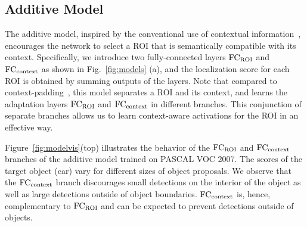 \documentclass[runningheads]{llncs}
\begin{document}
\subsection{Additive Model}\label{sec:additive}%

The additive model, inspired by the conventional use of contextual
information~\cite{Oliva:2007ui,Rabinovich:2007wy,Felzenszwalb:2009wx,Girshick:2016ig,Gidaris:2015cx},
encourages the network to select a ROI that is semantically compatible with its context. 
Specifically, we introduce two fully-connected layers ${\rm FC_{ROI}}$ and ${\rm FC_{context}}$ as shown in Fig.~\ref{fig:models} (a), and the localization score for each ROI is obtained by summing outputs of the layers. Note that compared to context-padding~\cite{Girshick:2016ig}, 
this model separates a ROI and its
context, and learns the adaptation layers ${\rm FC_{ROI}}$ and ${\rm
FC_{context}}$ in different branches. This conjunction of separate
branches allows us to learn context-aware activations for the ROI in an
effective way. %

Figure~\ref{fig:modelvis}(top) illustrates the behavior of the ${\rm FC_{ROI}}$ and ${\rm FC_{context}}$
branches of the additive model trained on PASCAL VOC 2007. The scores of
the target object (car) vary for different sizes of object proposals.
We observe that the ${\rm FC_{context}}$ branch discourages small detections on the
interior of the object as well as large detections outside of object boundaries.
${\rm FC_{context}}$ is, hence, complementary to ${\rm FC_{ROI}}$ and can be expected to prevent detections
outside of objects.
\end{document}
